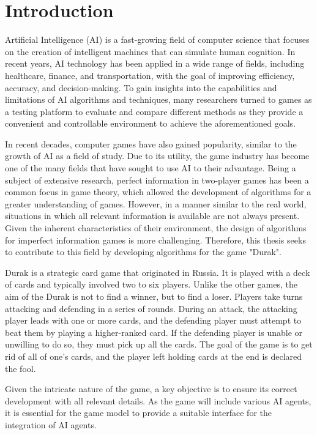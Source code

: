 \chapter*{Introduction}

Artificial Intelligence (AI) is a fast-growing field of computer science that focuses on the creation of intelligent machines that can simulate human cognition. In recent years, AI technology has been applied in a wide range of fields, including healthcare, finance, and transportation, with the goal of improving efficiency, accuracy, and decision-making. To gain insights into the capabilities and limitations of AI algorithms and techniques, many researchers turned to games as a testing platform to evaluate and compare different methods as they provide a convenient and controllable environment to achieve the aforementioned goals. 

In recent decades, computer games have also gained popularity, similar to the growth of AI as a field of study. Due to its utility, the game industry has become one of the many fields that have sought to use AI to their advantage. Being a subject of extensive research, perfect information in two-player games has been a common focus in game theory, which allowed the development of algorithms for a greater understanding of games. However, in a manner similar to the real world, situations in which all relevant information is available are not always present. Given the inherent 
characteristics of their environment, the design of algorithms for imperfect information games is more challenging. Therefore, this thesis seeks to contribute to this field by developing algorithms for the game "Durak".

Durak is a strategic card game that originated in Russia. It is played with a deck of cards and typically involved two to six players. Unlike the other games, the aim of the Durak is not to find a winner, but to find a loser. Players take turns attacking and defending in a series of rounds. During an attack, the attacking player leads with one or more cards, and the defending player must attempt to beat them by playing a higher-ranked card. If the defending player is unable or unwilling to do so, they must pick up all the cards. The goal of the game is to get rid of all of one's cards, and the player left holding cards at the end is declared the fool. \cite{website:PAGAT}

Given the intricate nature of the game, a key objective is to ensure its correct development with all relevant details. As the game will include various AI agents, it is essential for the game model to provide a suitable interface for the integration of AI agents. 

